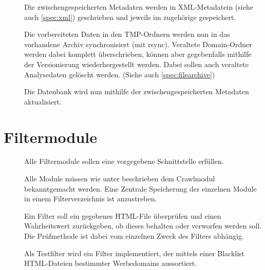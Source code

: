\begin{description}
	\item []
		Die zwischengespeicherten Metadaten werden in XML-Metadatein (siehe auch \ref{spec:xml}) 
		geschrieben und jeweils im zugehörige \htmlarc gespeichert. 
	\item []
		Die vorbereiteten Daten in den TMP-Ordnern werden nun in das vorhandene Archiv synchronisiert 
		(mit rsync). 
		Veraltete Domain-Ordner werden dabei komplett überschrieben, 
		können aber gegebenfalls mithilfe der Versionierung wiederhergestellt werden. 
		Dabei sollen auch veraltete Analysedaten gelöscht werden.
		(Siehe auch \ref{spec:filearchive})
	\item []
		Die Datenbank wird nun mithilfe der zwischengespeicherten Metadaten aktualisiert.
\end{description}

\section{Filtermodule}
\begin{description}
	\item []
		Alle Filtermodule sollen eine vorgegebene Schnittstelle erfüllen.
	\item []
		Alle Module müssen wie unter  beschrieben dem Crawlmodul bekanntgemacht werden.
		Eine Zentrale Speicherung der einzelnen Module in einem Filterverzeichnis ist anzustreben.
	\item []
		Ein Filter soll ein gegebenes HTML-File überprüfen und einen Wahrheitswert zurückgeben,
		ob dieses behalten oder verworfen werden soll.
		Die Prüfmethode ist dabei vom einzelnen Zweck des Filters abhängig.
	\item []
		Als Testfilter wird ein Filter implementiert, 
		der mittels einer Blacklist HTML-Dateien bestimmter Werbedomains aussortiert.
\end{description}

